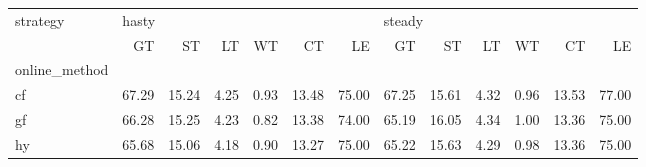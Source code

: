 \begin{tabular}{lrrrrrrrrrrrr}
\toprule
strategy & \multicolumn{6}{l}{hasty} & \multicolumn{6}{l}{steady} \\
{} &    GT &    ST &   LT &   WT &    CT &    LE &     GT &    ST &   LT &   WT &    CT &    LE \\
online\_method &       &       &      &      &       &       &        &       &      &      &       &       \\
\midrule
cf            & 67.29 & 15.24 & 4.25 & 0.93 & 13.48 & 75.00 &  67.25 & 15.61 & 4.32 & 0.96 & 13.53 & 77.00 \\
gf            & 66.28 & 15.25 & 4.23 & 0.82 & 13.38 & 74.00 &  65.19 & 16.05 & 4.34 & 1.00 & 13.36 & 75.00 \\
hy            & 65.68 & 15.06 & 4.18 & 0.90 & 13.27 & 75.00 &  65.22 & 15.63 & 4.29 & 0.98 & 13.36 & 75.00 \\
\bottomrule
\end{tabular}
